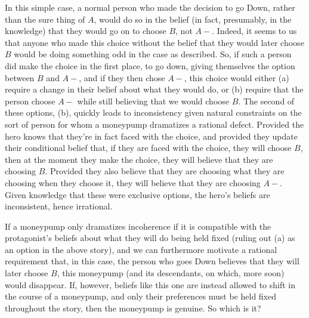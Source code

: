 \documentclass[11pt]{article}
\theoremstyle{definition}
\theoremstyle{definition}
\begin{document}
In this simple case, a normal person who made the decision to go Down, rather than the sure thing of $A$, would do so in the belief (in fact, presumably, in the knowledge) that they would go on to choose $B$, not $A-$. Indeed, it seems to us that anyone who made this choice without the belief that they would later choose $B$ would be doing something odd in the case as described. So, if such a person did make the choice in the first place, to go down, giving themselves the option between $B$ and $A-$, and if they then chose $A-$, this choice would either (a) require a change in their belief about what they would do, or (b) require that the person choose $A-$ while still believing that we would choose $B$. The second of these options, (b), quickly leads to inconsistency given natural constraints on the sort of person for whom a moneypump dramatizes a rational defect. Provided the hero knows that they're in fact faced with the choice, and provided they update their conditional belief that, if they are faced with the choice, they will choose $B$, then at the moment they make the choice, they will believe that they are choosing $B$. Provided they also believe that they are choosing what they are choosing when they choose it, they will believe that they are choosing $A-$. Given knowledge that these were exclusive options, the hero's beliefs are inconsistent, hence irrational. 

If a moneypump only dramatizes incoherence if it is compatible with the protagonist's beliefs about what they will do being held fixed (ruling out (a) as an option in the above story), and we can furthermore motivate a rational requirement that, in this case, the person who goes Down believes that they will later choose $B$, this moneypump (and its descendants, on which, more soon) would disappear. If, however, beliefs like this one are instead allowed to shift in the course of a moneypump, and only their preferences must be held fixed throughout the story, then the moneypump is genuine. So which is it?
\end{document}
